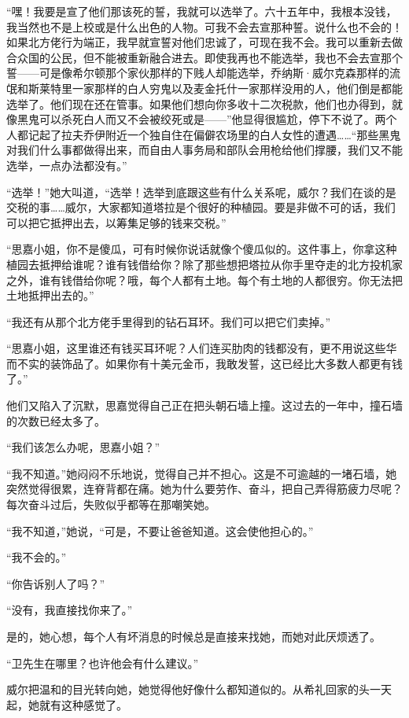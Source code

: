 \par “嘿！我要是宣了他们那该死的誓，我就可以选举了。六十五年中，我根本没钱，我当然也不是上校或是什么出色的人物。可我不会去宣那种誓。说什么也不会的！如果北方佬行为端正，我早就宣誓对他们忠诚了，可现在我不会。我可以重新去做合众国的公民，但不能被重新融合进去。即使我再也不能选举，我也不会去宣那个誓——可是像希尔顿那个家伙那样的下贱人却能选举，乔纳斯·威尔克森那样的流氓和斯莱特里一家那样的白人穷鬼以及麦金托什一家那样没用的人，他们倒是都能选举了。他们现在还在管事。如果他们想向你多收十二次税款，他们也办得到，就像黑鬼可以杀死白人而又不会被绞死或是——”他显得很尴尬，停下不说了。两个人都记起了拉夫乔伊附近一个独自住在偏僻农场里的白人女性的遭遇……“那些黑鬼对我们什么事都做得出来，而自由人事务局和部队会用枪给他们撑腰，我们又不能选举，一点办法都没有。”
\par “选举！”她大叫道，“选举！选举到底跟这些有什么关系呢，威尔？我们在谈的是交税的事……威尔，大家都知道塔拉是个很好的种植园。要是非做不可的话，我们可以把它抵押出去，以筹集足够的钱来交税。”
\par “思嘉小姐，你不是傻瓜，可有时候你说话就像个傻瓜似的。这件事上，你拿这种植园去抵押给谁呢？谁有钱借给你？除了那些想把塔拉从你手里夺走的北方投机家之外，谁有钱借给你呢？哦，每个人都有土地。每个有土地的人都很穷。你无法把土地抵押出去的。”
\par “我还有从那个北方佬手里得到的钻石耳环。我们可以把它们卖掉。”
\par “思嘉小姐，这里谁还有钱买耳环呢？人们连买肋肉的钱都没有，更不用说这些华而不实的装饰品了。如果你有十美元金币，我敢发誓，这已经比大多数人都更有钱了。”
\par 他们又陷入了沉默，思嘉觉得自己正在把头朝石墙上撞。这过去的一年中，撞石墙的次数已经太多了。
\par “我们该怎么办呢，思嘉小姐？”
\par “我不知道。”她闷闷不乐地说，觉得自己并不担心。这是不可逾越的一堵石墙，她突然觉得很累，连脊背都在痛。她为什么要劳作、奋斗，把自己弄得筋疲力尽呢？每次奋斗过后，失败似乎都等在那嘲笑她。
\par “我不知道，”她说，“可是，不要让爸爸知道。这会使他担心的。”
\par “我不会的。”
\par “你告诉别人了吗？”
\par “没有，我直接找你来了。”
\par 是的，她心想，每个人有坏消息的时候总是直接来找她，而她对此厌烦透了。
\par “卫先生在哪里？也许他会有什么建议。”
\par 威尔把温和的目光转向她，她觉得他好像什么都知道似的。从希礼回家的头一天起，她就有这种感觉了。
